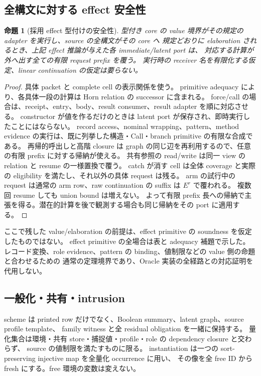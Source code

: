 \documentclass[11pt,a4paper]{article}
\newtheorem{theorem}{命題}[section]
\theoremstyle{remark}
\begin{document}
\subsection{全構文に対する effect 安全性}

\begin{theorem}[採用 effect 型付けの安全性]
型付き core の value 境界がその規定の adapter を実行し、source の全構文がその core へ
規定どおりに elaboration されるとき、上記 effect 推論が与えた各 immediate/latent port は、
対応する計算が外へ出す全ての有限 request prefix を覆う。
実行時の receiver 名を有限化する仮定、linear continuation の仮定は要らない。
\end{theorem}
\begin{proof}
具体 packet と complete cell の表示関係を使う。
primitive adequacy により、各具体一段の計算は Horn relation の successor に含まれる。
force/call の場合は、receipt、entry、body、result consumer、result adapter を順に対応させる。
constructor が値を作るだけのときは latent port が保存され、即時実行したことにはならない。
record access、nominal wrapping、pattern、method evidence の実行は、既に列挙した構造・Call・branch
primitive の有限な合成である。
再帰的呼出しと高階 closure は graph の同じ辺を再利用するので、任意の有限 prefix に対する帰納が使える。
共有参照の read/write は同一 view の relation と resume の一様置換で覆う。
catch が消す cell は全体 coverage と実際の eligibility を満たし、それ以外の具体 request は残る。
arm の試行中の request は通常の arm row、raw continuation の suffix は $E^r$ で覆われる。
複数回 resume しても union bound は増えない。
よって有限 prefix 長への帰納で主張を得る。潜在的計算を後で観測する場合も同じ帰納をその port に適用する。\qedhere
\end{proof}

ここで残した value/elaboration の前提は、effect primitive の soundness を仮定したものではない。
effect primitive の全場合は表と adequacy 補題で示した。
レコード変換、role evidence、pattern の binding、値制限などの value 側の命題と合わせるための
通常の定理境界であり、Oracle 実装の全経路との対応証明を代用しない。

\subsection{一般化・共有・intrusion}

scheme は printed row だけでなく、Boolean summary、latent graph、source profile template、
family witness と全 residual obligation を一緒に保持する。
量化集合は環境・共有 store・捕捉値・profile・role の dependency closure と交わらず、
source の値制限を満たすものに限る。
instantiation は一つの sort-preserving injective map を全量化 occurrence に用い、
その像を全 free ID から fresh にする。free 環境の変数は変えない。
\end{document}
